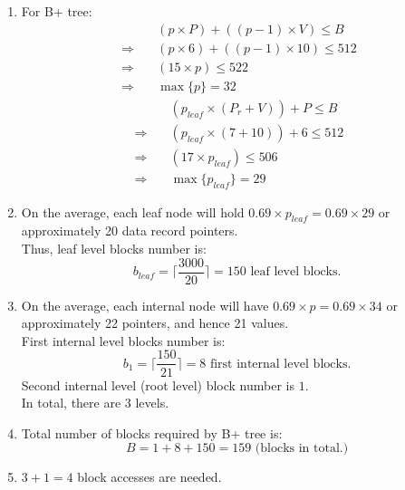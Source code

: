 \begin{homeworkProblem}
\begin{homeworkSubProblem}
    \begin{enumerate}[label=(\roman*)]
        \item For B+ tree:
            \begin{align*}
                & (p \times P) + ((p - 1) \times V) \leq B \\
                \Rightarrow\quad & (p \times 6) + ((p - 1) \times 10) \leq 512 \\
                \Rightarrow\quad  & (15 \times p) \leq 522 \\
                \Rightarrow\quad  & \max\{p\} = 32
            \end{align*}
            \begin{align*}
                & (p_{leaf} \times (P_r + V)) + P \leq B \\
                \Rightarrow\quad & (p_{leaf} \times (7 + 10)) + 6 \leq 512 \\
                \Rightarrow\quad  & (17 \times p_{leaf}) \leq 506 \\
                \Rightarrow\quad  & \max\{p_{leaf}\} = 29
            \end{align*}
        \item On the average, each leaf node will hold $0.69 \times p_{leaf} = 0.69 \times 29$
            or approximately 20 data record pointers.\\
            Thus, leaf level blocks number is:
            \[b_{leaf} = \bigg\lceil\frac{3000}{20}\bigg\rceil = 150
            \text{ leaf level blocks. }\]
        \item On the average, each internal node will have
            $0.69 \times p = 0.69 \times 34$ or approximately 22 pointers,
            and hence 21 values.\\
            First internal level blocks number is:
            \[b_1 = \bigg\lceil\frac{150}{21}\bigg\rceil = 8
            \text{ first internal level blocks. }\]
            Second internal level (root level) block number is $1$.\\
            In total, there are $3$ levels.
        \item Total number of blocks required by B+ tree is:
            \[B = 1 + 8 + 150 = 159 \text{ (blocks in total.) }\]
        \item $3 + 1 = 4$ block accesses are needed.
    \end{enumerate}
\end{homeworkSubProblem}

\end{homeworkProblem}
